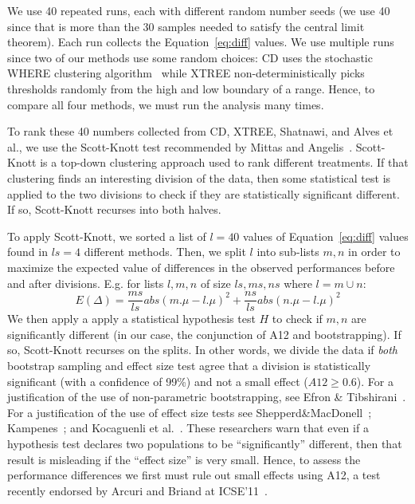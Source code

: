 \documentclass[twocolumn,5p]{elsarticle}
\newcommand{\eq}[1]{Equation~\ref{eq:#1}}
\theoremstyle{break}
\begin{document}
\begin{itemize}
We use 40 repeated runs, each with different random number seeds (we use 40 since that is  more than the 30 samples  needed to satisfy the central limit theorem). Each run collects the \eq{diff} values.
We use multiple runs since two of our methods use some random choices: CD uses the  stochastic WHERE clustering algorithm~\cite{localvsglobal}
while XTREE non-deterministically picks thresholds randomly from
the high and low boundary of a range. 
 Hence, to compare all
four methods, we must run the analysis many times. 





To rank these 40 numbers collected from CD, XTREE, Shatnawi, and Alves et al., we use the Scott-Knott test recommended by Mittas and Angelis~\cite{mittas13}. 
Scott-Knott is a top-down clustering approach used to rank different
treatments. If that clustering finds an interesting division of the data, then
some statistical test is applied to the two divisions to check if they
are statistically significant different. If so, Scott-Knott recurses
into both halves.

To  apply Scott-Knott,
  we
sorted a list of  $l=40$ values of \eq{diff} values found in  $ls=4$ different methods. 
Then, we split $l$ into sub-lists $m,n$ in order to maximize the expected value of differences in the observed performances before and after divisions. E.g. for lists $l,m,n$ of size $ls,ms,ns$ where $l=m\cup n$: \[E(\Delta)=\frac{ms}{ls}abs(m.\mu - l.\mu)^2 + \frac{ns}{ls}abs(n.\mu - l.\mu)^2\]
We then apply a apply a statistical hypothesis test $H$ to check
if $m,n$ are significantly different  (in our case, the conjunction of A12 and bootstrapping). If so, Scott-Knott recurses on the splits. In other words, we divide the data if \textit{both} bootstrap sampling and effect size test agree that a division is statistically significant (with a confidence of 99\%) and not a small effect ($A12 \ge 0.6$).
For a justification of the use of non-parametric bootstrapping, see Efron \& Tibshirani~\cite[p220-223]{efron93}. For a justification of the use of effect size tests see Shepperd\&MacDonell~\cite{shepperd12a}; Kampenes~\cite{kampenes07}; and Kocaguenli et al.~\cite{Kocaguneli2013:ep}. These researchers warn that even if a hypothesis test declares two populations to be ``significantly'' different, then that result is misleading if the ``effect size'' is very small. Hence, to assess the performance differences we first must rule out small effects using A12, a test   recently endorsed by Arcuri and Briand at ICSE'11~\cite{arcuri11}.


\end{itemize}
\end{document}
